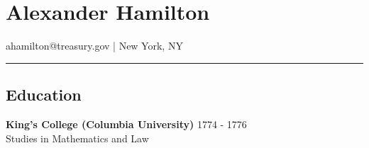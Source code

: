 \documentclass{article}
\begin{document}
\section*{Alexander Hamilton}
ahamilton@treasury.gov | New York, NY
\hrule
\vspace{3mm}
\subsection*{Education}
\textbf{King's College (Columbia University)} \hfill 1774 - 1776 \\
Studies in Mathematics and Law
\end{document}
